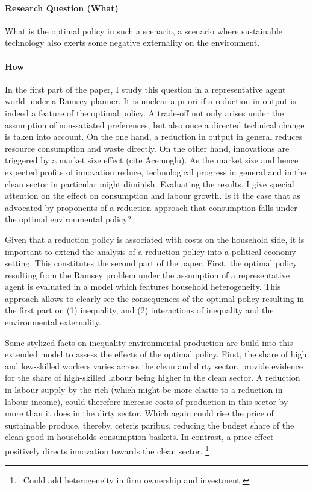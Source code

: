 \documentclass[12pt]{article}
\newcommand{\ar}{$\Rightarrow$ \ }
\begin{document}
\paragraph{Research Question (What)}
 What is the optimal policy in such a scenario, a scenario where sustainable technology also exerts some negative externality on the environment.

\paragraph{How}
In the first part of the paper, I study this question in a representative agent world under a Ramsey planner. 
It is unclear a-priori if a reduction in output is indeed  a feature of the optimal policy. A trade-off not only arises under the assumption of non-satiated preferences, but also once a directed technical change is taken into account. 
On the one hand, a reduction in output in general reduces resource consumption and waste directly. On the other hand, innovations are triggered by a market size effect (cite Acemoglu). As the market size and hence expected profits of innovation reduce, technological progress in general and in the clean sector in particular might diminish. 
Evaluating the results, I give special attention on the effect on consumption and labour growth. Is it the case that as advocated by proponents of a reduction approach that consumption falls under the optimal environmental policy? 




Given that a reduction policy is associated with costs on the household side, it is important to extend the analysis of a reduction policy into a political economy setting. This constitutes the second part of the paper. 
First, the optimal policy resulting from the Ramsey problem under the assumption of a representative agent is evaluated in a model which features household heterogeneity. This approach allows to clearly see the consequences of the optimal policy resulting in the first part on (1) inequality, and (2) interactions of  inequality and the environmental externality. 

Some stylized facts on inequality environmental production are build into this extended model to assess  the effects of the optimal policy. First, the share of high and low-skilled workers varies across the clean and dirty sector. \cite{Bowen2018CharacterisingComposition, Consoli2016DoCapital} provide evidence for the share of high-skilled labour being higher in the clean sector. A reduction in labour supply by the rich (which might be more elastic to a reduction in labour income), could therefore increase costs of production in this sector by more than it does in the dirty sector. Which again could rise the price of sustainable produce, thereby, ceteris paribus, reducing the budget share of the clean good in households consumption baskets. In contrast, a price effect positively directs innovation towards the clean sector. 
\footnote{\ Could add heterogeneity in firm ownership and investment. }
\end{document}
